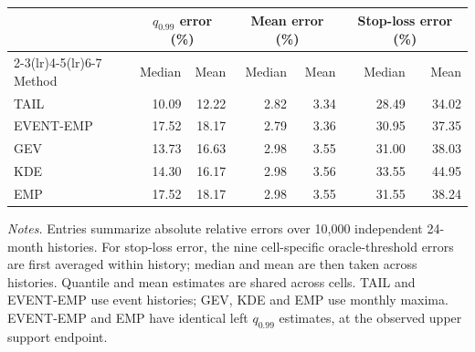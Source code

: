 \documentclass[12pt,a4paper]{article}
\newcommand{\tablebodyfont}{\small}
\newcommand{\tablefootnotefont}{\small}
\begin{document}
\setcounter{table}{1}
\begingroup
\centering
{}
\label{tab:table_2}
{\tablebodyfont
\setlength{\tabcolsep}{4pt}
\renewcommand{\arraystretch}{1.15}
\begin{tabular*}{\linewidth}{@{\extracolsep{\fill}}lrrrrrr@{}}
\toprule
&\multicolumn{2}{c}{$q_{0.99}$ error (\%)}&\multicolumn{2}{c}{Mean error (\%)}&\multicolumn{2}{c}{Stop-loss error (\%)}\\
\cmidrule(lr){2-3}\cmidrule(lr){4-5}\cmidrule(lr){6-7}
Method & Median & Mean & Median & Mean & Median & Mean\\
\midrule
TAIL & 10.09 & 12.22 & 2.82 & 3.34 & 28.49 & 34.02\\
EVENT-EMP & 17.52 & 18.17 & 2.79 & 3.36 & 30.95 & 37.35\\
GEV & 13.73 & 16.63 & 2.98 & 3.55 & 31.00 & 38.03\\
KDE & 14.30 & 16.17 & 2.98 & 3.56 & 33.55 & 44.95\\
EMP & 17.52 & 18.17 & 2.98 & 3.55 & 31.55 & 38.24\\\bottomrule
\end{tabular*}}
\par\smallskip
{\tablefootnotefont\textit{Notes.}
Entries summarize absolute relative errors over 10,000 independent 24-month histories.
For stop-loss error, the nine cell-specific oracle-threshold errors are first averaged within history; median and mean are then taken across histories. Quantile and mean estimates are shared across cells. TAIL and EVENT-EMP use event histories; GEV, KDE and EMP use monthly maxima. EVENT-EMP and EMP have identical left $q_{0.99}$ estimates, at the observed upper support endpoint.}
\endgroup
\end{document}
